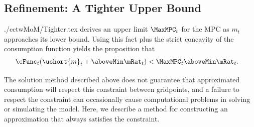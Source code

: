 \documentclass[titlepage]{\econtex}
\begin{document}
\hypertarget{Refinement-A-Tighter-Upper-Bound}{}
\subsection{Refinement: A Tighter Upper Bound}
\begin{verbatimwrite}{./cctwMoM/Tighter.tex}
  \cite{BufferStockTheory} derives an upper limit  $\MaxMPC_{t}$ for the MPC as $m_{t}$
  approaches its lower bound.  Using this 
  fact plus the strict concavity of the consumption function yields the
  proposition that 
  \begin{equation}\begin{gathered}\begin{aligned}
    \cFunc_{t}(\ushort{m}_{t}+\aboveMin \mRat_{t}) & < \MaxMPC_{t} \aboveMin \mRat_{t}.
  \end{aligned}\end{gathered}\end{equation}

  The solution method described above does not guarantee that
  approximated consumption will respect this constraint between gridpoints, and a failure to 
  respect the constraint can occasionally cause computational problems in solving
  or simulating the model.  Here, we 
  describe a method for constructing an approximation that always
  satisfies the constraint.

\end{verbatimwrite}
\end{document}
